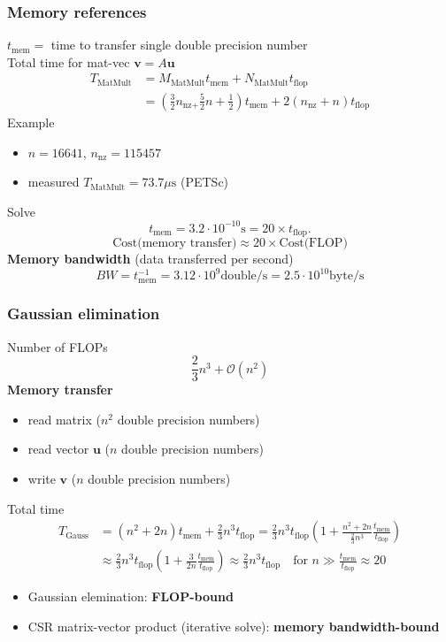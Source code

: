 \documentclass{beamer}
\renewcommand{\vec}[1]{\boldsymbol{#1}}
\begin{document}

\begin{frame}
  \frametitle{Memory references}
  $t_{\text{mem}} = $ time to transfer single double precision number\\[1ex]  
  Total time for mat-vec $\vec{v}=A\vec{u}$  
$$
\begin{aligned}
T_{\text{MatMult}} &= M_{\text{MatMult}} t_{\text{mem}} + N_{\text{MatMult}} t_{\text{flop}}\\
&= \left(\frac{3}{2} n_{\text{nz} + }\frac{5}{2} n + \frac{1}{2}\right) t_{\text{mem}} + 2(n_{\text{nz}}+n)t_{\text{flop}}
\end{aligned}
$$
Example
\begin{itemize}
  \item $n=16641$, $n_{\text{nz}}=115457$
  \item measured $T_{\text{MatMult}}=73.7\mu\text{s}$ (PETSc)
\end{itemize}
Solve
$$
t_{\text{mem}} = 3.2\cdot 10^{-10} \text{s}= 20\times t_{\text{flop}}.
$$
$$
\text{Cost(memory transfer)} \approx 20\times \text{Cost(FLOP)}
$$
\textbf{Memory bandwidth} (data transferred per second)
$$
BW = t_{\text{mem}}^{-1} = 3.12 \cdot 10^9 \text{double}/\text{s} = 2.5\cdot 10^{10} \text{byte}/\text{s}
$$
\end{frame}


\begin{frame}
  \frametitle{Gaussian elimination}
Number of FLOPs 
$$\frac{2}{3}n^3 + \mathcal{O}(n^2)$$
\textbf{Memory transfer}
\begin{itemize}
\item read matrix ($n^2$ double precision numbers)
\item read vector $\boldsymbol{u}$ ($n$ double precision numbers)
\item write $\boldsymbol{v}$ ($n$ double precision numbers)
\end{itemize}
Total time
$$
\begin{aligned}
T_{\text{Gauss}} &= \left(n^2 + 2n\right)t_{\text{mem}} + \frac{2}{3}n^3 t_{\text{flop}}= \frac{2}{3}n^3 t_{\text{flop}}\left(1 + \frac{n^2 + 2n}{\frac{2}{3}n^3}\frac{t_{\text{mem}}}{t_{\text{flop}}} \right)\\
&\approx \frac{2}{3}n^3 t_{\text{flop}}\left(1 + \frac{3}{2n}\frac{t_{\text{mem}}}{t_{\text{flop}}} \right)
\approx \frac{2}{3}n^3 t_{\text{flop}} \quad\text{for $n\gg \frac{t_{\text{mem}}}{t_{\text{flop}}}\approx 20$}
\end{aligned}
$$
\begin{itemize}
\item Gaussian elemination: \textbf{FLOP-bound}
\item CSR matrix-vector product (iterative solve): \textbf{memory bandwidth-bound}
\end{itemize}
\end{frame}
\end{document}
